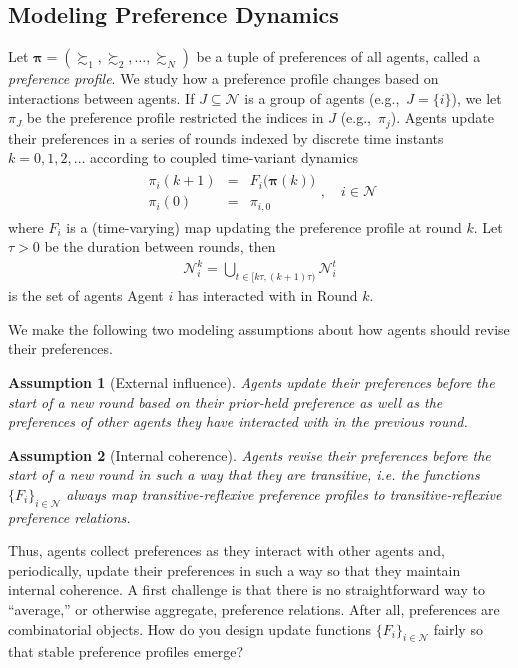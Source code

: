 \documentclass[conference]{ieeeconf}
\newcommand{\N}{\mathcal{N}}
\newcommand{\prefers}{\succsim}
\newtheorem{assumption}{Assumption}
\begin{document}
\subsection{Modeling Preference Dynamics}
Let $\boldsymbol{\pi} = \left( \prefers_1, \prefers_2, \dots, \prefers_N \right)$ be a tuple of preferences of all agents, called a \emph{preference profile}. We study how a preference profile changes based on interactions between agents. If $J \subseteq \N$ is a group of agents (e.g.,~$J = \{i\}$), we let $\pi_{J}$ be the preference profile restricted the indices in $J$ (e.g.,~$\pi_j$). Agents update their preferences in a series of rounds indexed by discrete time instants $k=0,1,2,\dots$ according to coupled time-variant dynamics
\begin{align}
    \begin{aligned}
        \pi_i(k+1) &=& F_i \bigl( \boldsymbol{\pi}(k) \bigr)  \\
        \pi_i(0) &=& \pi_{i,0}
    \end{aligned}, \quad i \in \N
    \label{eq:pi-dynamics}
\end{align}
where $F_i$ is a (time-varying) map updating the preference profile at round $k$. Let $\tau > 0$ be the duration between rounds, then
\begin{align*}
    \N_i^k = \bigcup_{t \in [k \tau, (k+1)\tau)} \N_i^t
\end{align*}
is the set of agents Agent $i$ has interacted with in Round $k$.

We make the following two modeling assumptions about how agents should revise their preferences.
\begin{assumption}[External influence]\label{ass:external}
    Agents update their preferences before the start of a new round based on  their prior-held preference as well as the preferences of other agents they have interacted with in the previous round.
\end{assumption}
\begin{assumption}[Internal coherence] \label{ass:internal}
    Agents revise their preferences before the start of a new round in such a way that they are transitive, i.e. the functions $\{ F_i \}_{i \in \N}$ always map transitive-reflexive preference profiles to transitive-reflexive preference relations.
\end{assumption}

Thus, agents collect preferences as they interact with other agents and, periodically, update their preferences in such a way so that they maintain internal coherence. A first challenge is that there is no straightforward way to ``average,'' or otherwise aggregate, preference relations. After all, preferences are combinatorial objects. How do you design update functions $\{F_i\}_{i \in \N}$ fairly so that stable preference profiles emerge?
\end{document}
